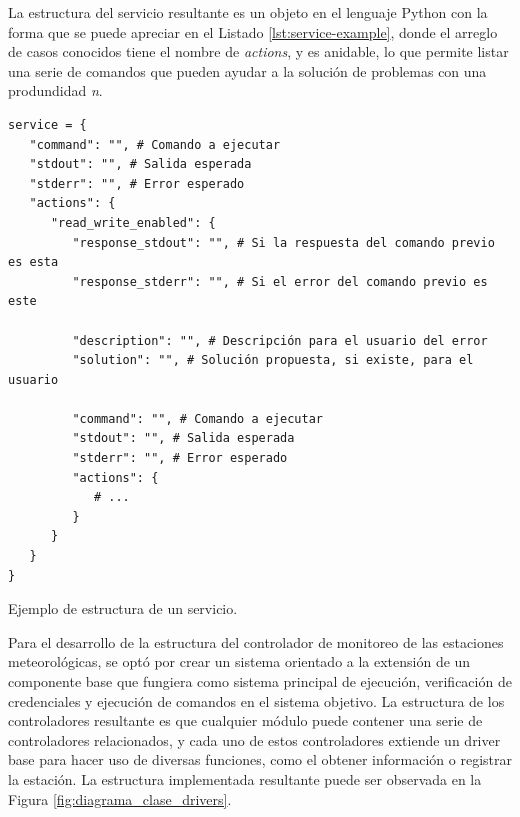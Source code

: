La estructura del servicio resultante es un objeto en el lenguaje Python con la forma que se puede apreciar en el Listado \ref{lst:service-example}, donde el arreglo de casos conocidos tiene el nombre de \textit{actions}, y es anidable, lo que permite listar una serie de comandos que pueden ayudar a la solución de problemas con una produndidad \textit{n}.

\begin{listing}
\begin{verbatim}
service = {
   "command": "", # Comando a ejecutar
   "stdout": "", # Salida esperada
   "stderr": "", # Error esperado
   "actions": {
      "read_write_enabled": {
         "response_stdout": "", # Si la respuesta del comando previo es esta
         "response_stderr": "", # Si el error del comando previo es este

         "description": "", # Descripción para el usuario del error
         "solution": "", # Solución propuesta, si existe, para el usuario

         "command": "", # Comando a ejecutar
         "stdout": "", # Salida esperada
         "stderr": "", # Error esperado
         "actions": {
            # ...
         }
      }
   }
}
\end{verbatim}
\caption{Ejemplo de estructura de un servicio.}
\label{lst:service-example}
\end{listing}

Para el desarrollo de la estructura del controlador de monitoreo de las estaciones meteorológicas, se optó por crear un sistema orientado a la extensión de un componente base que fungiera como sistema principal de ejecución, verificación de credenciales y ejecución de comandos en el sistema objetivo. La estructura de los controladores resultante es que cualquier módulo puede contener una serie de controladores relacionados, y cada uno de estos controladores extiende un driver base para hacer uso de diversas funciones, como el obtener información o registrar la estación. La estructura implementada resultante puede ser observada en la Figura \ref{fig:diagrama_clase_drivers}.

